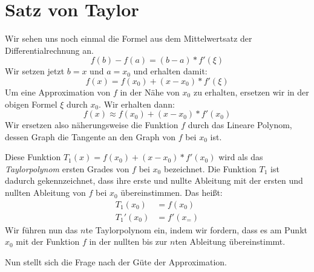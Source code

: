 \section{Satz von Taylor}
Wir sehen uns noch einmal die Formel aus dem Mittelwertsatz der Differentialrechnung an.
\begin{equation*}
	f(b)-f(a)=(b-a)*f'(\xi)
\end{equation*}
Wir setzen jetzt $b=x$ und $a=x_0$ und erhalten damit:
\begin{equation*}
	f(x)=f(x_0)+(x-x_0)*f'(\xi)
\end{equation*}
Um eine Approximation von $f$ in der Nähe von $x_0$ zu erhalten, ersetzen wir in der obigen Formel $\xi$ durch $x_0$. Wir erhalten dann:
\begin{equation*}
	f(x)\approx f(x_0)+(x-x_0)*f'(x_0)
\end{equation*}
Wir ersetzen also näherungsweise die Funktion $f$ durch das Lineare Polynom, dessen Graph die Tangente an den Graph von $f$ bei $x_0$ ist.

Diese Funktion $T_1(x)=f(x_0)+(x-x_0)*f'(x_0)$ wird als das \emph{Taylorpolynom} ersten Grades von $f$ bei $x_0$ bezeichnet. Die Funktion $T_1$ ist dadurch gekennzeichnet, dass ihre erste und nullte Ableitung mit der ersten und nullten Ableitung von $f$ bei $x_0$ übereinstimmen. Das heißt:
\begin{align*}
	T_1(x_0)&=f(x_0)\\
	T_1'(x_0)&=f'(x_=)
\end{align*}
Wir führen nun das $n$te Taylorpolynom ein, indem wir fordern, dass es am Punkt $x_0$ mit der Funktion $f$ in der nullten bis zur $n$ten Ableitung übereinstimmt.

Nun stellt sich die Frage nach der Güte der Approximation.

